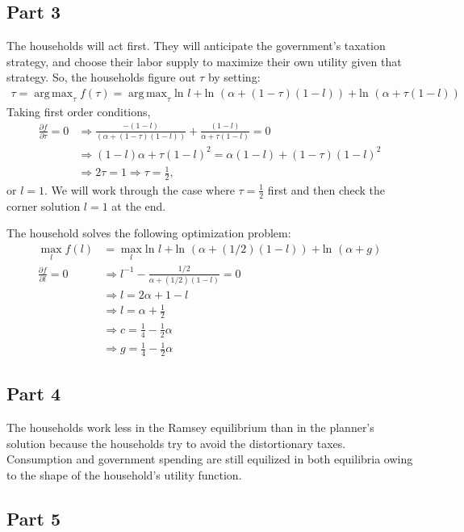 \documentclass[11pt]{article} %
\DeclareMathOperator*{\argmax}{arg\,max}
\begin{document}
\subsection{Part 3}
The households will act first. They will anticipate the government's taxation strategy, and choose their labor supply to maximize their own utility given that strategy. So, the households figure out $\tau$ by setting:
\begin{align*}
\tau = \argmax_{\tau} f(\tau) = \argmax_{\tau} \text{ln }l +\text{ln }(\alpha + (1-\tau) (1-l)) +\text{ln }(\alpha + \tau(1-l)) 
\end{align*}
Taking first order conditions,
\begin{align*}
\frac{\partial f}{\partial \tau} = 0 &\Rightarrow \frac{-(1-l)}{(\alpha + (1-\tau) (1-l))} + \frac{(1-l)}{\alpha + \tau(1-l)} = 0\\
&\Rightarrow (1-l)\alpha + \tau (1-l)^2 = \alpha(1-l) + (1-\tau)(1-l)^2 \\
&\Rightarrow 2\tau = 1 \Rightarrow \tau = \frac{1}{2},
\end{align*}
or $l=1$. We will work through the case where $\tau=\frac{1}{2}$ first and then check the corner solution $l=1$ at the end.

The household solves the following optimization problem:
\begin{align*}
\max_{l} f(l) &= \max_{l} \text{ln }l +\text{ln }(\alpha + (1/2) (1-l)) +\text{ln }(\alpha + g) \\
\frac{\partial f}{\partial l} = 0 &\Rightarrow l^{-1} -\frac{1/2}{\alpha + (1/2)(1-l)} = 0\\
&\Rightarrow l = 2\alpha + 1 - l \\
&\Rightarrow l = \alpha + \frac{1}{2}\\
&\Rightarrow c = \frac{1}{4} - \frac{1}{2}\alpha \\
&\Rightarrow g = \frac{1}{4} - \frac{1}{2}\alpha
\end{align*}

\subsection{Part 4}
The households work less in the Ramsey equilibrium than in the planner's solution because the households try to avoid the distortionary taxes.  Consumption and government spending are still equilized in both equilibria owing to the shape of the household's utility function.
\subsection{Part 5}
\end{document}
